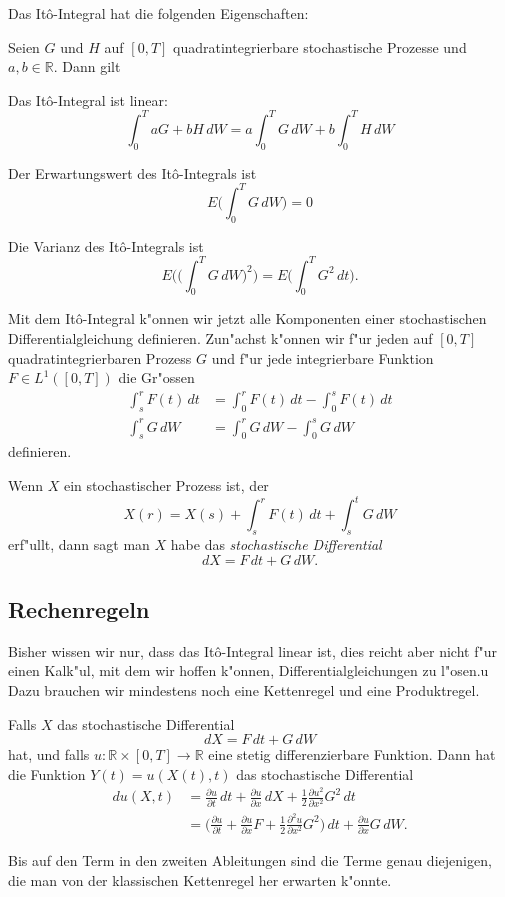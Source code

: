 Das It\^o-Integral hat die folgenden Eigenschaften:

\begin{satz}
\label{satz:ito-integral}
Seien $G$ und $H$ auf $[0,T]$ quadratintegrierbare stochastische Prozesse
und $a,b\in\mathbb R$. Dann gilt
\begin{compactenum}
\item Das It\^o-Integral ist linear:
\[
\int_0^T aG+bH\,dW
=
a\int_0^TG\,dW
+
b\int_0^TH\,dW
\]
\item Der Erwartungswert des It\^o-Integrals ist
\[
E\biggl(\int_0^T G\,dW\biggr)=0
\]
\item Die Varianz des It\^o-Integrals ist
\[
E\biggl(\biggl(\int_0^TG\,dW\biggr)^2\biggr)
=
E\biggl(\int_0^T G^2\,dt\biggr).
\]
\end{compactenum}
\end{satz}

Mit dem It\^o-Integral k"onnen wir jetzt alle Komponenten einer
stochastischen Differentialgleichung definieren.
Zun"achst k"onnen wir f"ur jeden auf $[0,T]$ quadratintegrierbaren Prozess $G$ 
und f"ur jede integrierbare Funktion $F\in L^1([0,T])$ die Gr"ossen
\begin{align*}
\int_s^r F(t)\,dt&=\int_0^r F(t)\,dt - \int_0^s F(t)\,dt
\\
\int_s^r G\,dW&=\int_0^r G\,dW - \int_0^s G\,dW
\end{align*}
definieren.
\begin{definition}
Wenn $X$ ein stochastischer Prozess ist, der
\[
X(r)=X(s)+\int_s^rF(t)\,dt + \int_s^tG\,dW
\]
erf"ullt, dann sagt man $X$ habe das {\em stochastische Differential}
\[
dX=F\,dt + G\,dW.
\]
\end{definition}

%
%
%
\subsection{Rechenregeln}
Bisher wissen wir nur, dass das It\^o-Integral linear ist, dies reicht
aber nicht f"ur einen Kalk"ul, mit dem wir hoffen k"onnen,
Differentialgleichungen zu l"osen.u
Dazu brauchen wir mindestens noch eine Kettenregel und eine
Produktregel.

\begin{satz}[It\^o's Kettenregel]
Falls $X$ das stochastische Differential
\[
dX=F\,dt + G\,dW
\]
hat, und falls $u\colon \mathbb R\times [0,T]\to\mathbb R$ eine
stetig differenzierbare Funktion.
Dann hat die Funktion $Y(t)=u(X(t), t)$ das stochastische Differential
\begin{align*}
du(X,t)
&=\frac{\partial u}{\partial t}\,dt + \frac{\partial u}{\partial x}\,dX 
+\frac12\frac{\partial u^2}{\partial x^2}G^2\,dt
\\
&=
\biggl(
\frac{\partial u}{\partial t}+\frac{\partial u}{\partial x}F
+\frac12\frac{\partial^2u}{\partial x^2}G^2
\biggr)\,dt
+
\frac{\partial u}{\partial x}G\,dW.
\end{align*}
\end{satz}
Bis auf den Term in den zweiten Ableitungen sind die Terme genau
diejenigen, die man von der klassischen Kettenregel her erwarten
k"onnte.

